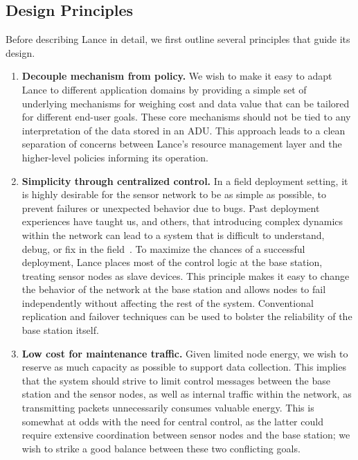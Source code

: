 \subsection{Design Principles}

Before describing Lance in detail, we first outline several principles 
that guide its design. 

\begin{enumerate}

\item \textbf{Decouple mechanism from policy.} We wish to make it easy to
adapt Lance to different application domains by providing a simple set of
underlying mechanisms for weighing cost and data value that can be tailored
for different end-user goals. These core mechanisms should not be tied to any
interpretation of the data stored in an ADU. This approach leads to a clean
separation of concerns between Lance's resource management layer and the
higher-level policies informing its operation.

\item \textbf{Simplicity through centralized control.} In a field deployment
setting, it is highly desirable for the sensor network to be as simple as
possible, to prevent failures or unexpected behavior due to bugs. Past
deployment experiences have taught us, and others, that introducing complex
dynamics within the network can lead to a system that is difficult to
understand, debug, or fix in the field~\cite{volcano-osdi06,volcano-ewsn05}.
To maximize the chances of a successful deployment, Lance places most of the
control logic at the base station, treating sensor nodes as slave devices.
This principle makes it easy to change the behavior of the network at the
base station and allows nodes to fail independently without affecting the
rest of the system. Conventional replication and failover techniques can be
used to bolster the reliability of the base station itself.

\item \textbf{Low cost for maintenance traffic.} Given limited node energy,
we wish to reserve as much capacity as possible to support data collection.
This implies that the system should strive to limit control messages between
the base station and the sensor nodes, as well as internal traffic within the
network, as transmitting packets unnecessarily consumes valuable energy.
This is somewhat at odds with the need for central control, as the latter
could require extensive coordination between sensor nodes and the base
station; we wish to strike a good balance between these two conflicting
goals.

\end{enumerate}

